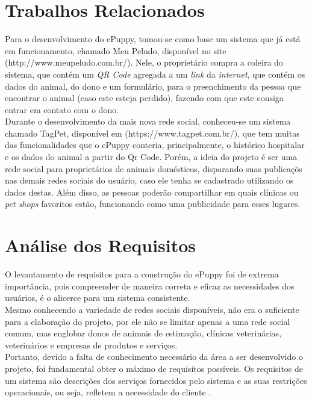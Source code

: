 \section{Trabalhos Relacionados}
Para o desenvolvimento do ePuppy, tomou-se como base um sistema que já está em funcionamento, chamado Meu Peludo, disponível no site (http://www.meupeludo.com.br/). Nele, o proprietário compra a coleira do sistema, que contém um {\it QR Code} agregada a um {\it link} da {\it internet}, que contém os dados do animal, do dono e um formulário, para o preenchimento da pessoa que encontrar o animal (caso este esteja perdido), fazendo com que este consiga entrar em contato com o dono. %
\\
\indent
Durante o desenvolvimento da mais nova rede social, conheceu-se um sistema chamado TagPet, disponível em (https://www.tagpet.com.br/), que tem muitas das funcionalidades que o ePuppy conteria, principalmente, o histórico hospitalar e os dados do animal a partir do Qr Code. Porém, a ideia do projeto é ser uma rede social para proprietários de animais domésticos,%
disparando suas publicaçõs nas demais redes sociais do usuário, caso ele tenha se cadastrado utilizando os dados destas. Além disso, as pessoas poderão compartilhar em quais clínicas ou {\it pet shops} favoritos estão, funcionando como uma publicidade para esses lugares.


\section{Análise dos Requisitos}
O levantamento de requisitos para a construção do ePuppy foi de extrema importância, pois compreender de maneira correta e eficaz as necessidades dos usuários, é o alicerce para um sistema consistente. 
\\
\indent
Mesmo conhecendo a variedade de redes sociais disponíveis, não era o suficiente para a elaboração do projeto, por ele não se limitar apenas a uma rede social comum, mas englobar donos de animais de estimação, clínicas veterinárias, veterinários e empresas de produtos e serviços.
\\
\indent
Portanto, devido a falta de conhecimento necessário da área a ser desenvolvido o projeto, foi fundamental obter o máximo de requisitos possíveis. Os requisitos de um sistema são descrições dos serviços fornecidos pelo sistema e as suas restrições operacionais, ou seja, refletem a necessidade do cliente \cite{Sommerville2011}.



